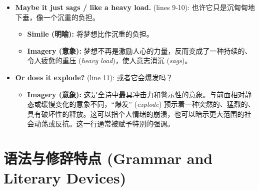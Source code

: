 \documentclass[12pt, a4paper]{article}
\begin{document}
\begin{itemize}
\begin{itemize}
        \end{itemize}
    \item \textbf{Maybe it just sags / like a heavy load.} (lines 9-10): 也许它只是沉甸甸地下垂，像一个沉重的负担。
        \begin{itemize}
            \item \textbf{Simile (明喻):} 将梦想比作沉重的负担。
            \item \textbf{Imagery (意象):} 梦想不再是激励人心的力量，反而变成了一种持续的、令人疲惫的重压 (\textit{heavy load})，使人意志消沉 (\textit{sags})。
        \end{itemize}
    \item \textbf{Or does it explode?} (line 11): 或者它会爆发吗？
        \begin{itemize}
            \item \textbf{Imagery (意象):} 这是全诗中最具冲击力和警示性的意象。与前面相对静态或缓慢变化的意象不同，“爆发” (\textit{explode}) 预示着一种突然的、猛烈的、具有破坏性的释放。这可以指个人情绪的崩溃，也可以暗示更大范围的社会动荡或反抗。这一行通常被赋予特别的强调。
        \end{itemize}
\end{itemize}

\section{语法与修辞特点 (Grammar and Literary Devices)}
\end{document}
